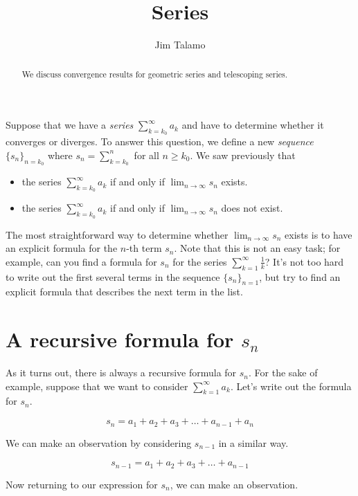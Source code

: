 \documentclass{ximera}
\author{Jim Talamo}
\title[Dig-In:]{Series}
\begin{document}
\begin{abstract}
We discuss convergence results for geometric series and telescoping series.
\end{abstract}
\maketitle

Suppose that we have a \emph{series} $\sum_{k=k_0}^{\infty} a_k$ and have to determine whether it converges or diverges.  To answer this question, we define a new \emph{sequence} $\{s_n\}_{n=k_0}$ where $s_n = \sum_{k=k_0}^{n}$ for all $n \geq k_0$.  We saw previously that
 
 \begin{itemize}
\item the series $\sum_{k=k_0}^\infty a_k$  if and only if $\lim_{n\to\infty} s_n$ exists.  
\item the series $\sum_{k=k_0}^\infty a_k$  if and only if $\lim_{n\to\infty} s_n$ does not exist.  
\end{itemize}

The most straightforward way to determine whether $\lim_{n \to \infty} s_n$ exists is to have an explicit formula for the $n$-th term $s_n$.  Note that this is not an easy task; for example, can you find a formula for $s_n$ for the series $\sum_{k=1}^{\infty} \frac{1}{k}$? It's not too hard to write out the first several terms in the sequence $\{s_n\}_{n=1}$, but try to find an explicit formula that describes the next term in the list.

\section{A recursive formula for $s_n$}
As it turns out, there is always a recursive formula for $s_n$.  For the sake of example, suppose that we want to consider $\sum_{k=1}^{\infty} a_k$.  Let's write out the formula for $s_n$.

\[
s_n = a_1+a_2+a_3+\ldots+a_{n-1}+a_n
\]


We can make an observation by considering $s_{n-1}$ in a similar way.

\[
s_{n-1} = a_1+a_2+a_3+\ldots+a_{n-1}
\]

Now returning to our expression for $s_n$, we can make an observation. 
\begin{image}
  \end{image}
\end{document}
